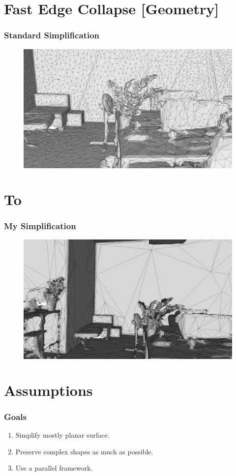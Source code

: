 \documentclass[
	10pt,
	t		%
]{beamer}
\begin{document}
\section{Fast Edge Collapse [Geometry]}
\begin{frame}
\frametitle{Standard Simplification}
\begin{figure}[ht]
\centering
\includegraphics[width=1\textwidth]{fast_collapse}
\end{figure}
\end{frame}

\section{To}
\begin{frame}
\frametitle{My Simplification}
\begin{figure}[ht]
	\centering
    \includegraphics[width=1\textwidth]{to}
\end{figure}
\end{frame}

\section{Assumptions}
\begin{frame}
\frametitle{Goals}
\begin{enumerate}
\item Simplify mostly planar surface.
\item Preserve complex shapes as much as possible.
\item Use a parallel framework.
\end{enumerate}
\end{frame}
\end{document}
